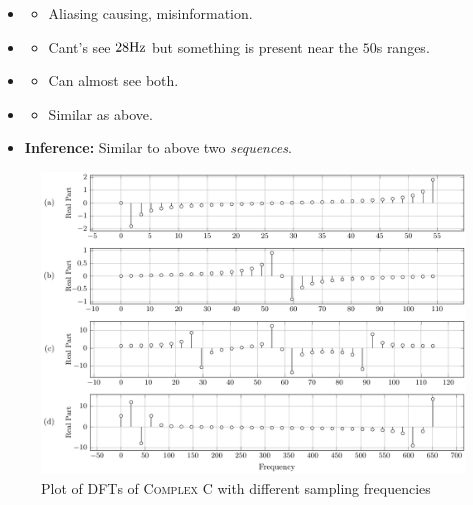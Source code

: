 \documentclass[../../course]{subfiles}
\begin{document}
\begin{itemize} [label=]

    \item \sampFreqMuchLess
        \begin{itemize} [label=]
            \item Aliasing causing, misinformation.
        \end{itemize}

    \item \sampFreqNorm
        \begin{itemize} [label=]
            \item Cant's see $\freqXOne \si{Hz}$ but something is present near the $50$s ranges.
        \end{itemize}

    \item \sampFreqSligGreat
        \begin{itemize} [label=]
            \item Can almost see both.
        \end{itemize}

    \item \sampFreqMuchGreat
        \begin{itemize} [label=]
            \item Similar as above.
        \end{itemize}

    \item \textbf{Inference:} Similar to above two \emph{sequences}.

\end{itemize}

\vfill

\begin{figure} [H]
    \centering
     {
        \includegraphics[height = 0.8\textheight] {tikzpics/plotDftComplexC32.pdf}
    }
     {Plot of \textsc{DFT}s of \textsc{Complex C} with different sampling frequencies}
    \label{plt:dftComplexC}
\end{figure}
\end{document}
